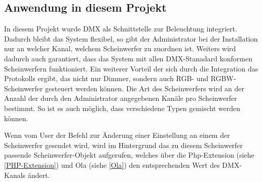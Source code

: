 \hypertarget{anwendung-in-diesem-projekt}{%
\subsection{Anwendung in diesem
Projekt}\label{anwendung-in-diesem-projekt}}

In diesem Projekt wurde DMX als Schnittstelle zur Beleuchtung
integriert. Dadurch bleibt das System flexibel, so gibt der
Administrator bei der Installation nur an welcher Kanal, welchem
Scheinwerfer zu zuordnen ist. Weiters wird dadurch auch garantiert, dass
das System mit allen DMX-Stanadard konformen Scheinwerfern funktioniert.
Ein weiterer Vorteil der sich durch die Integration das Protokolls
ergibt, das nicht nur Dimmer, sondern auch RGB- und RGBW-Scheinwerfer
gesteuert werden können. Die Art des Scheinwerfers wird an der Anzahl
der durch den Administrator angegebenen Kanäle pro Scheinwerfer
bestimmt. So ist es auch möglich, dass verschiedene Typen gemischt
werden können.

Wenn vom User der Befehl zur Änderung einer Einstellung an einem der
Scheinwerfer gesendet wird, wird im Hintergrund das zu diesem
Scheinwerfer passende Scheinwerfer-Objekt aufgerufen, welches über die
Php-Extension (siehe \ref{PHP-Extension}) und Ola (siehe \ref{Ola}) den
entsprechenden Wert des DMX-Kanals ändert.
